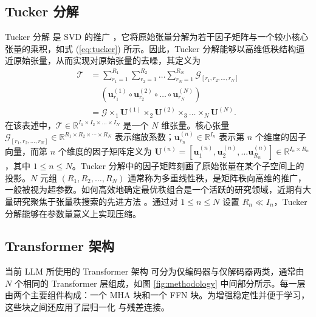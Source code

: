 \subsection{Tucker 分解}

Tucker 分解 \cite{tucker1966some} 是 SVD 的推广 \cite{de2000multilinear, vasilescu2002multilinear}，它将原始张量分解为若干因子矩阵与一个较小核心张量的乘积，如式 (\ref{eq:tucker}) 所示。因此，Tucker 分解能够以高维低秩结构逼近原始张量，从而实现对原始张量的去噪，其定义为
\begin{equation}
\begin{split}
    \mathcal{T} &= \sum_{r_1=1}^{R_1} \sum_{r_2=1}^{R_2} \dots \sum_{r_N=1}^{R_N} \mathcal{G}_{[r_1, r_2, \dots, r_N]} \\
    & \quad \ \left(\mathbf{u}^{(1)}_{r_1} \circ \mathbf{u}_{r_2}^{(2)} \circ \dots \circ \mathbf{u}_{r_N}^{(N)} \right)\\
    &= \mathcal{G} \times_1 \mathbf{U}^{(1)} \times_2 \mathbf{U}^{(2)} \times_3 \dots \times_N \mathbf{U}^{(N)}.
\end{split}
\label{eq:tucker}
\end{equation}
在该表述中，$\mathcal{T} \in \mathbb{R}^{I_1 \times I_2 \times \dots \times I_N}$ 是一个 $N$ 维张量。核心张量 $\mathcal{G}_{[r_1, r_2, \dots, r_N]} \in \mathbb{R}^{R_1 \times R_2 \times \cdots \times R_N}$ 表示缩放系数；$\mathbf{u}_{r_n}^{(n)} \in \mathbb{R}^{I_n}$ 表示第 $n$ 个维度的因子向量，而第 $n$ 个维度的因子矩阵定义为 $\mathbf{U}^{(n)} = \left[ \mathbf{u}_1^{(n)}, \mathbf{u}_2^{(n)}, \dots \mathbf{u}_{R_n}^{(n)} \right] \in \mathbb{R}^{I_n \times R_n}$，其中 $1\leq n \leq N$。Tucker 分解中的因子矩阵刻画了原始张量在某个子空间上的投影。$N$ 元组 $(R_1, R_2, \dots, R_N)$ 通常称为多重线性秩，是矩阵秩向高维的推广，一般被视为超参数。如何高效地确定最优秩组合是一个活跃的研究领域，近期有大量研究聚焦于张量秩搜索的先进方法 \cite{iacovides2024towards, 10655696}。通过对 $1\leq n \leq N$ 设置 $R_n \ll I_n$，Tucker 分解能够在参数量意义上实现压缩。

\subsection{Transformer 架构}
当前 LLM 所使用的 Transformer 架构 \cite{vaswani2017attention} 可分为仅编码器与仅解码器两类，通常由 $N$ 个相同的 Transformer 层组成，如图 \ref{fig:methodology} 中间部分所示。每一层由两个主要组件构成：一个 MHA 块和一个 FFN 块。为增强稳定性并便于学习，这些块之间还应用了层归一化 \cite{lei2016layer} 与残差连接。

